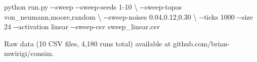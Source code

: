 \documentclass[
  11pt,
]{article}
\newenvironment{Shaded}{}{}
\newcommand{\AttributeTok}[1]{\textcolor[rgb]{0.49,0.56,0.16}{#1}}
\newcommand{\DataTypeTok}[1]{\textcolor[rgb]{0.56,0.13,0.00}{#1}}
\newcommand{\ExtensionTok}[1]{#1}
\newcommand{\NormalTok}[1]{#1}
\begin{document}
\begin{Shaded}
\begin{Highlighting}[]
\ExtensionTok{python}\NormalTok{ run.py }\AttributeTok{{-}{-}sweep} \AttributeTok{{-}{-}sweep{-}seeds}\NormalTok{ 1{-}10 }\DataTypeTok{\textbackslash{}}
  \AttributeTok{{-}{-}sweep{-}topos}\NormalTok{ von\_neumann,moore,random }\DataTypeTok{\textbackslash{}}
  \AttributeTok{{-}{-}sweep{-}noises}\NormalTok{ 0.04,0.12,0.30 }\DataTypeTok{\textbackslash{}}
  \AttributeTok{{-}{-}ticks}\NormalTok{ 1000 }\AttributeTok{{-}{-}size}\NormalTok{ 24 }\AttributeTok{{-}{-}activation}\NormalTok{ linear }\AttributeTok{{-}{-}sweep{-}csv}\NormalTok{ sweep\_linear.csv}
\end{Highlighting}
\end{Shaded}

Raw data (10 CSV files, 4,180 runs total) available at
github.com/brian-mwirigi/consim.
\end{document}
